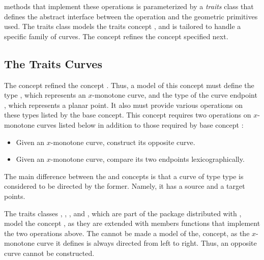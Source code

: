 methods that implement these operations is parameterized by a {\em traits}
class that defines the abstract interface between the operation and the 
geometric primitives used. The traits class models the traits concept 
, and is tailored to handle a specific 
family of curves. The concept  refines the 
concept  specified next.

\subsection{The Traits Curves}
\label{bso_ssec:traits_curves}
The concept  refined the 
concept . Thus, a model of this 
concept must define the type , which represents 
an $x$-monotone curve, and the type of the curve endpoint , 
which represents a planar point. It also must provide various operations 
on these types listed by the base concept. This  concept requires two 
operations on $x$-monotone curves listed below in addition to those
required by base concept :
\begin{itemize}
\item Given an $x$-monotone curve, construct its opposite curve.
\item Given an $x$-monotone curve, compare its two endpoints 
lexicographically.
\end{itemize}
The main difference between the 
and  concepts  is that a curve
of type  type is considered to be directed by
the former. Namely, it has a source and a target points.

The traits classes , 
, ,
and , which are part of the  
package distributed with \cgal, model the concept 
, as they are extended with 
members functions that implement the two operations above.
The  cannot be made a model of the, 
 concept, as the
$x$-monotone curve it defines is always directed from left to right. Thus, an
opposite curve cannot be constructed.

